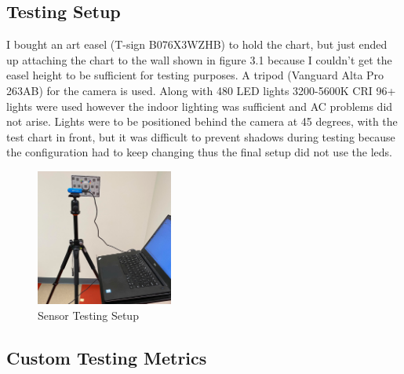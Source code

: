 \subsection{Testing Setup}
I bought an art easel (T-sign B076X3WZHB) to hold the chart, but just ended up attaching the chart to the wall shown in figure 3.1 because I couldn't get the easel height to be sufficient for testing purposes. A tripod (Vanguard Alta Pro 263AB) for the camera is used. Along with 480 LED lights 3200-5600K CRI 96+ lights were used however the indoor lighting was sufficient and AC problems did not arise. Lights were to be positioned behind the camera at 45 degrees, with the test chart in front, but it was difficult to prevent shadows during testing because the configuration had to keep changing thus the final setup did not use the leds. 
\begin{figure}[!htb]
	\caption{Sensor Testing Setup}
	\centering
	\includegraphics[width=0.4\textwidth, angle=0]{images/sensor_testing.png}
\end{figure}

\subsection{Custom Testing Metrics}

